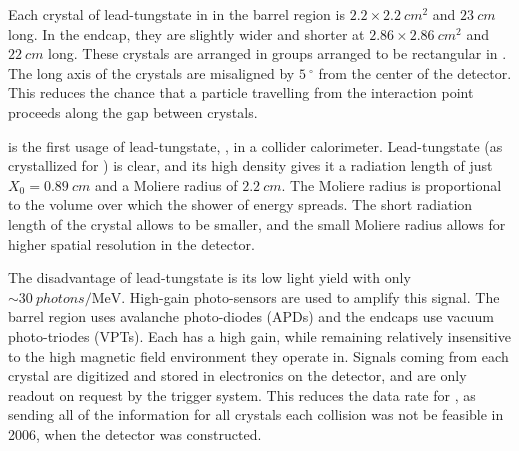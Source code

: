 Each crystal of lead-tungstate in \ECAL in the barrel region is \ensuremath{2.2\times \SI{2.2}{cm^2}} and \ensuremath{\SI{23}{cm}} long. In the endcap, they are slightly wider and shorter at \ensuremath{2.86\times \SI{2.86}{cm^2}} and \ensuremath{\SI{22}{cm}} long. These crystals are arranged in \fivebyfive groups arranged to be rectangular in \etaphi. The long axis of the crystals are misaligned by \ensuremath{\SI{5}{^\circ}} from the center of the detector. This reduces the chance that a particle travelling from the interaction point proceeds along the gap between crystals. 


\ECAL is the first usage of lead-tungstate, \leadtungstate, in a collider calorimeter. Lead-tungstate (as crystallized for \CMS) is clear, and its high density gives it a radiation length of just \ensuremath{X_0 = \SI{0.89}{cm}} and a Moliere radius of \ensuremath{\SI{2.2}{cm}}. The Moliere radius is proportional to the volume over which the shower of energy spreads. The short radiation length of the crystal allows \ECAL to be smaller, and the small Moliere radius allows for higher spatial resolution in the detector.

The disadvantage of lead-tungstate is its low light yield with only \ensuremath{\sim\SI{30}{photons/\MeV}}. High-gain photo-sensors are used to amplify this signal.  The barrel region uses avalanche photo-diodes (APDs) and the endcaps use vacuum photo-triodes (VPTs).  Each has a high gain, while remaining relatively insensitive to the high magnetic field environment they operate in. Signals coming from each crystal are digitized and stored in electronics on the detector, and are only readout on request by the \CMS trigger system. This reduces the data rate for \ECAL, as sending all of the information for all crystals each collision was not be feasible in 2006, when the detector was constructed.

